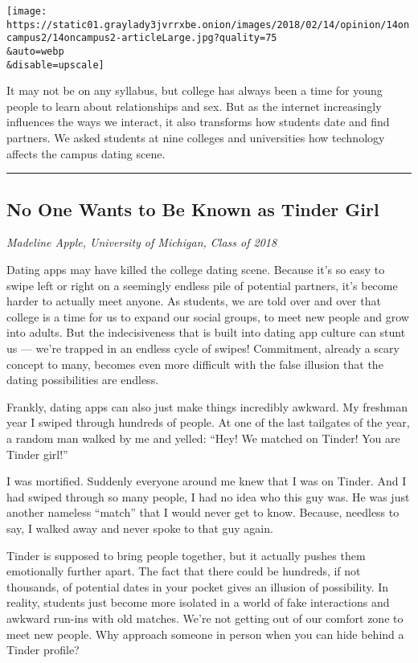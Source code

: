 \texttt{[image: https://static01.graylady3jvrrxbe.onion/images/2018/02/14/opinion/14oncampus2/14oncampus2-articleLarge.jpg?quality=75\\\&auto=webp\\\&disable=upscale]}

It may not be on any syllabus, but college has always been a time for
young people to learn about relationships and sex. But as the internet
increasingly influences the ways we interact, it also transforms how
students date and find partners. We asked students at nine colleges and
universities how technology affects the campus dating scene.

\begin{center}\rule{0.5\linewidth}{\linethickness}\end{center}

\hypertarget{no-one-wants-to-be-known-as-tinder-girl}{%
\subsection{No One Wants to Be Known as Tinder
Girl}\label{no-one-wants-to-be-known-as-tinder-girl}}

\emph{Madeline Apple, University of Michigan, Class of 2018}

Dating apps may have killed the college dating scene. Because it's so
easy to swipe left or right on a seemingly endless pile of potential
partners, it's become harder to actually meet anyone. As students, we
are told over and over that college is a time for us to expand our
social groups, to meet new people and grow into adults. But the
indecisiveness that is built into dating app culture can stunt us ---
we're trapped in an endless cycle of swipes! Commitment, already a scary
concept to many, becomes even more difficult with the false illusion
that the dating possibilities are endless.

Frankly, dating apps can also just make things incredibly awkward. My
freshman year I swiped through hundreds of people. At one of the last
tailgates of the year, a random man walked by me and yelled: ``Hey! We
matched on Tinder! You are Tinder girl!''

I was mortified. Suddenly everyone around me knew that I was on Tinder.
And I had swiped through so many people, I had no idea who this guy was.
He was just another nameless ``match'' that I would never get to know.
Because, needless to say, I walked away and never spoke to that guy
again.

Tinder is supposed to bring people together, but it actually pushes them
emotionally further apart. The fact that there could be hundreds, if not
thousands, of potential dates in your pocket gives an illusion of
possibility. In reality, students just become more isolated in a world
of fake interactions and awkward run-ins with old matches. We're not
getting out of our comfort zone to meet new people. Why approach someone
in person when you can hide behind a Tinder profile?

